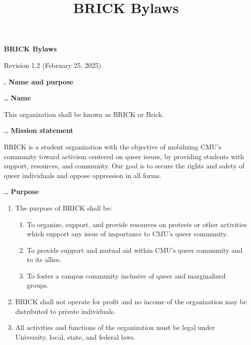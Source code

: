 \documentclass[11pt]{article}
\title{BRICK Bylaws}
\newcounter{h1}
\newcounter{h2}[h1]
\newcounter{h3}[h2]
\begin{document}
\newcommand{\tab}[1]{\stepcounter{h1}\par\large\textbf{\arabic{h1}. #1}\normalsize\par}
\newcommand{\subtab}[1]{\stepcounter{h2}\par\textbf{\arabic{h1}.\arabic{h2}. #1}\par}
\newcommand{\subsubtab}[1]{\stepcounter{h3}\par\small\textbf{\arabic{h1}.\arabic{h2}.\arabic{h3}. #1}\normalsize\par}
\renewcommand{\labelenumi}{\arabic{enumi}.}
\renewcommand{\labelenumii}{\arabic{enumi}.\arabic{enumii}.}
\renewcommand{\labelenumiii}{\arabic{enumi}.\arabic{enumii}.\arabic{enumiii}.}
\renewcommand{\labelenumiv}{\arabic{enumi}.\arabic{enumii}.\arabic{enumiii}.\arabic{enumiv}.}

\raggedright


\begin{center}
\Large
\textbf{BRICK Bylaws}

\normalsize
Revision 1.2 (February 25, 2025)
\end{center}


\tab{Name and purpose}

\subtab{Name}

This organization shall be known as BRICK or Brick.

\subtab{Mission statement}

BRICK is a student organization with the objective of mobilizing CMU's community toward activism centered on queer issues, by providing students with support, resources, and community. Our goal is to secure the rights and safety of queer individuals and oppose oppression in all forms.

\subtab{Purpose}

\begin{enumerate}
  \item The purpose of BRICK shall be:
  \begin{enumerate}
    \item To organize, support, and provide resources on protests or other activities which support any issue of importance to CMU's queer community.
    \item To provide support and mutual aid within CMU's queer community and to its allies.
    \item To foster a campus community inclusive of queer and marginalized groups.
  \end{enumerate}
  \item BRICK shall not operate for profit and no income of the organization may be distributed to private individuals.
  \item All activities and functions of the organization must be legal under University, local, state, and federal laws.
\end{enumerate}
\end{document}
